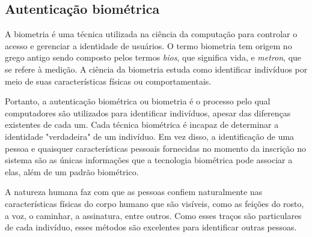 \subsection{Autenticação biométrica}
\label{subsec:autenticacao-biometrica}

A biometria é uma técnica utilizada na ciência da computação para controlar o
acesso e gerenciar a identidade de usuários.
O termo biometria tem origem no grego antigo sendo composto pelos termos \textit{bios},
que significa vida, e \textit{metron}, que se refere à medição.
A ciência da biometria estuda como identificar indivíduos por meio de suas
características físicas ou comportamentais\cite{idrus2013}.

Portanto, a autenticação biométrica ou biometria é o processo pelo qual
computadores
são utilizados para identificar indivíduos, apesar das diferenças existentes
de cada um.
Cada técnica biométrica é incapaz de determinar a identidade "verdadeira" de um
indivíduo.
Em vez disso, a identificação de uma pessoa e quaisquer características pessoais
fornecidas no momento da inscrição no sistema são as únicas informações que a
tecnologia biométrica pode associar a elas, além de um padrão biométrico\cite{wayman2005}.

A natureza humana faz com que as pessoas confiem naturalmente nas características
físicas do corpo humano que são visíveis, como as feições do rosto, a voz, o
caminhar,
a assinatura, entre outros.
Como esses traços são particulares de cada indivíduo, esses métodos são
excelentes para identificar outras pessoas\cite{alsaadi2015}.

